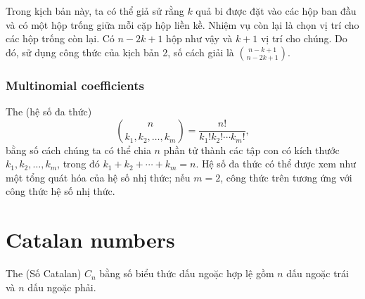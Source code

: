 \begin{center}
\end{center}

Trong kịch bản này, ta có thể giả sử rằng
$k$ quả bi được đặt vào các hộp ban đầu
và có một hộp trống giữa mỗi
cặp hộp liền kề.
Nhiệm vụ còn lại là chọn
vị trí cho các hộp trống còn lại.
Có $n-2k+1$ hộp như vậy và
$k+1$ vị trí cho chúng.
Do đó, sử dụng công thức của kịch bản 2,
số cách giải là
${n-k+1 \choose n-2k+1}$.

\subsubsection{Multinomial coefficients}


The  (hệ số đa thức)
\[ {n \choose k_1,k_2,\ldots,k_m} = \frac{n!}{k_1! k_2! \cdots k_m!}, \]
bằng số cách
chúng ta có thể chia $n$ phần tử thành các tập con
có kích thước $k_1,k_2,\ldots,k_m$,
trong đó $k_1+k_2+\cdots+k_m=n$.
Hệ số đa thức có thể được xem như một
tổng quát hóa của hệ số nhị thức;
nếu $m=2$, công thức trên
tương ứng với công thức hệ số nhị thức.

\section{Catalan numbers}


The  (Số Catalan)
$C_n$ bằng
số biểu thức dấu ngoặc hợp lệ
gồm $n$ dấu ngoặc trái và $n$ dấu ngoặc phải.


